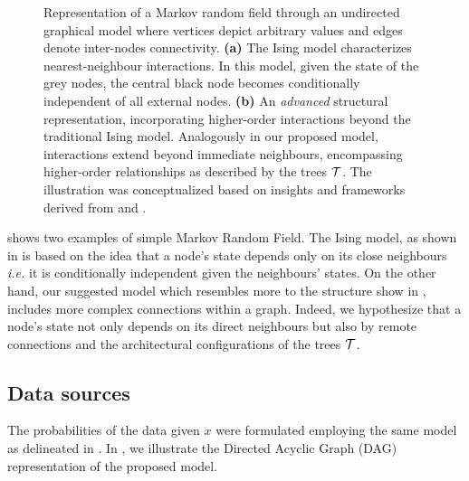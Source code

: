 \documentclass[
11pt, %
oneside, %
english, %
singlespacing, %
headsepline, %
chapterinoneline, %
]{MastersDoctoralThesis} %
\def\T{{\cal T}}
\begin{document}
\begin{figure}[t!]
\begin{subfigure}[h]{0.49\textwidth}
		\caption{}
		\label{fig: Ising model higher order}
	\end{subfigure}
	\caption{Representation of a Markov random field through an undirected graphical model where vertices depict arbitrary values and edges denote inter-nodes connectivity. \textbf{(a)} The Ising model \cite{isingBeitragZurTheorie1925} characterizes nearest-neighbour interactions. In this model, given the state of the grey nodes, the central black node becomes conditionally independent of all external nodes. \textbf{(b)} An \textit{advanced} structural representation, incorporating higher-order interactions beyond the traditional Ising model. Analogously in our proposed model, interactions extend beyond immediate neighbours, encompassing higher-order relationships as described by the trees $\T$. The illustration was conceptualized based on insights and frameworks derived from \cite{MarkovRandomField} and \cite{acarMarkovRandomField2016}. }
	\label{fig:MRF}
\end{figure}

 shows two examples of simple Markov Random Field. The Ising model, as shown in  is based on the idea that a node's state depends only on its close neighbours \textit{i.e.} it is conditionally independent given the neighbours' states. On the other hand, our suggested model which resembles more to the structure show in , includes more complex connections within a graph. Indeed, we hypothesize that a node's state not only depends on its direct neighbours but also by remote connections and the architectural configurations of the trees $\T$.

\subsection{Data sources}\label{subsec:data source RMF}
The probabilities of the data given $x$ were formulated employing the same model as delineated in . In , we illustrate the Directed Acyclic Graph (DAG) representation of the proposed model.
\end{document}
